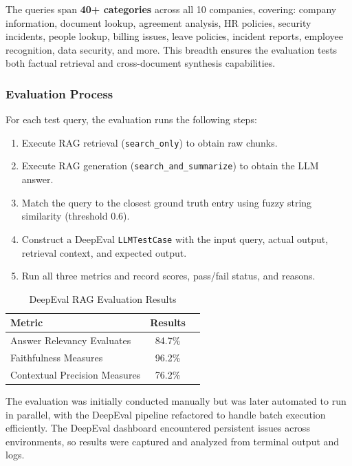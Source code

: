 The queries span \textbf{40+ categories} across all 10 companies, covering: company information, document lookup, agreement analysis, HR policies, security incidents, people lookup, billing issues, leave policies, incident reports, employee recognition, data security, and more. This breadth ensures the evaluation tests both factual retrieval and cross-document synthesis capabilities.

\subsubsection{Evaluation Process}

For each test query, the evaluation runs the following steps:
\begin{enumerate}
    \item Execute RAG retrieval (\texttt{search\_only}) to obtain raw chunks.
    \item Execute RAG generation (\texttt{search\_and\_summarize}) to obtain the LLM answer.
    \item Match the query to the closest ground truth entry using fuzzy string similarity (threshold 0.6).
    \item Construct a DeepEval \texttt{LLMTestCase} with the input query, actual output, retrieval context, and expected output.
    \item Run all three metrics and record scores, pass/fail status, and reasons.
\end{enumerate}

\begin{table}[H]
\centering
\caption{DeepEval RAG Evaluation Results}
\label{tab:deepeval_results}
\begin{tabular}{|l|c|c|}
\hline
\textbf{Metric} & \textbf{Results} \\ \hline
Answer Relevancy Evaluates & 84.7\%  \\ \hline
Faithfulness Measures & 96.2\%  \\ \hline
Contextual Precision Measures & 76.2\%  \\ \hline
\end{tabular}
\end{table}

The evaluation was initially conducted manually but was later automated to run in parallel, with the DeepEval pipeline refactored to handle batch execution efficiently. The DeepEval dashboard encountered persistent issues across environments, so results were captured and analyzed from terminal output and logs.
